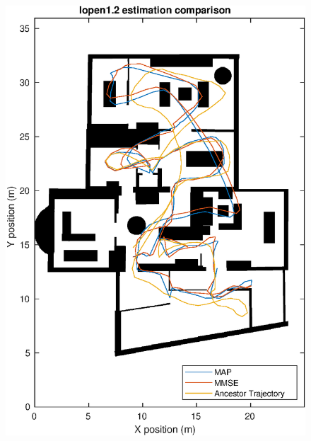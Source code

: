 \begin{figure}[H]
	\centering
	\includegraphics[width=0.5\linewidth]{images/20201108_1559_lopen1_2_estimation_comparison}
	\caption{}
	\label{fig:202011081559lopen12estimationcomparison}
\end{figure}




